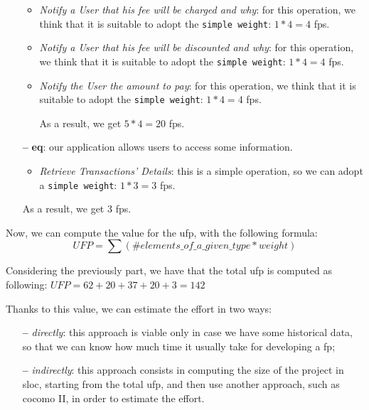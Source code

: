 \begin{itemize}
\begin{itemize}
	\item \textit{Notify a User that his fee will be charged and why}: for this operation, we think that it is suitable to adopt the \texttt{simple weight}: $1 * 4 = 4$ \acs{fp}s.
	
	\item \textit{Notify a User that his fee will be discounted and why}: for this operation, we think that it is suitable to adopt the \texttt{simple weight}: $1 * 4 = 4$ \acs{fp}s.
	
	\item \textit{Notify the User the amount to pay}:  for this operation, we think that it is suitable to adopt the \texttt{simple weight}: $1 * 4 = 4$ \acs{fp}s.

As a result, we get $5 * 4 = 20$ \acs{fp}s.

\end{itemize}

\item[\textbf{--}] \textbf{\acl{eq}}: our application allows users to access some information. 

\begin{itemize}

	\item \textit{Retrieve Transactions' Details}: this is a simple operation, so we can adopt a \texttt{simple weight}: $1 * 3 = 3$ \acs{fp}s.
\end{itemize}

As a result, we get $3$ \acs{fp}s.

\end{itemize}

Now, we can compute the value for the \acl{ufp}, with the following formula:
\[ UFP = \sum (\#elements\_of\_a\_given\_type * weight)\]

Considering the previously part, we have that the total \acs{ufp} is computed as following:
$UFP = 62 + 20 + 37 + 20 + 3 = 142$

Thanks to this value, we can estimate the effort in two ways:

\begin{itemize}

\item[\textbf{--}] \textit{directly}: this approach is viable only in case we have some historical data, so that we can know how much time it usually take for developing a \acs{fp};

\item[\textbf{--}] \textit{indirectly}: this approach consists in computing the size of the project in \acl{sloc}, starting from the total \acs{ufp}, and then use another approach, such as \acs{cocomo} II, in order to estimate the effort.

\end{itemize}


